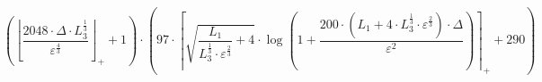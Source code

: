 \[\left(\left\lfloor \frac{2048 \cdot \Delta \cdot L_3^{\frac{1}{3}}}{\varepsilon^{\frac{4}{3}}} \right\rfloor_{+} + 1\right) \cdot \left(97 \cdot \left\lceil \sqrt{\frac{L_1}{L_3^{\frac{1}{3}} \cdot \varepsilon^{\frac{2}{3}}} + 4} \cdot \log\left(1 + \frac{200 \cdot \left(L_1 + 4 \cdot L_3^{\frac{1}{3}} \cdot \varepsilon^{\frac{2}{3}}\right) \cdot \Delta}{\varepsilon^{2}}\right) \right\rceil_{+} + 290\right)\]
